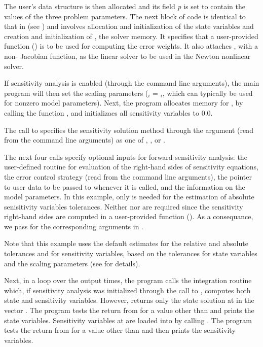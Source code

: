 The user's data structure is then allocated and its field {\em p} is set to contain
the values of the three problem parameters.
The next block of code is identical to that in  (see \cite{cvode2.4.0_ex})
and involves allocation and initialization of the state variables and creation and 
initialization of , the {\cvodes} solver memory. It specifies that
a user-provided function () is to be used for computing the error weights.
It also attaches {\cvdense}, with a non- Jacobian function, as the linear solver 
to be used in the Newton nonlinear solver.

If sensitivity analysis is enabled (through the command line arguments), 
the main program will then set the scaling parameters
 ($_i$ = $_i$, which can typically be used for 
nonzero model parameters). 
Next, the program allocates memory for , by calling the {\nvecs} function 
, and initializaes all sensitivity variables to $0.0$.

The call to  specifies the sensitivity solution
method through the argument  (read from the command
line arguments) as one of , , or
.

The next four calls specify optional inputs for forward sensitivity analysis:
the user-defined routine for evaluation of the right-hand
sides of sensitivity equations, the error control strategy
(read from the command line arguments), the pointer to
user data to be passed to  whenever it is called, and  
the information on the model parameters. In this example, only  is needed for the 
estimation of absolute senisitivity variables tolerances. Neither  nor 
are required since the sensitivity right-hand sides are computed in a user-provided
function (). As a consequance, we pass  for the corresponding arguments in
.

Note that this example uses the default estimates for the relative and absolute tolerances 
 and  for sensitivity variables, based on the tolerances for state 
variables and the scaling parameters  (see  for details).

Next, in a loop over the  output times, the program calls the integration
routine  which, if sensitivity analysis was initialized through the call
to , computes both state and sensitivity variables. However,
 returns only the state solution at  in the vector .
The program tests the return from  for a value other than  and
prints the state variables.
Sensitivity variables at  are loaded into  by calling .
The program tests the return from  for a value other than  
and then prints the sensitivity variables.

